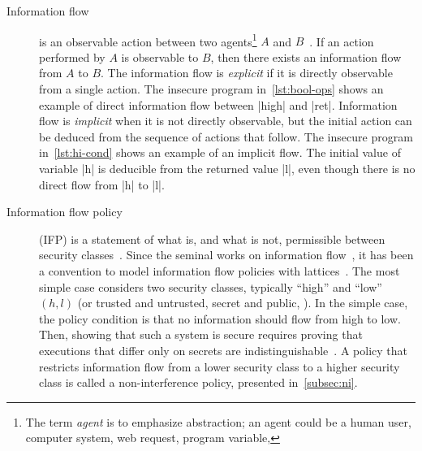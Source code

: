 \begin{description}

\item[Information flow]
is an observable action between two agents\footnote{
The term \emph{agent} is to emphasize abstraction; an agent could be a human user, computer system, web request, program variable, \etc
} \({A}\) and \({B}\)~\cite{eggert2014}.
If an action performed by \({A}\) is observable to \({B}\),
then there exists an information flow from \({A}\) to \({B}\).
The information flow is \emph{explicit} 
if it is directly observable from a single action.
The insecure program in~\autoref{lst:bool-ops} shows an example of direct information flow between \pr|high| and \pr|ret|.
Information flow is \emph{implicit} 
when it is not directly observable, but the initial action can be deduced from the sequence of actions that follow.
The insecure program in~\autoref{lst:hi-cond} shows an example of an implicit flow.
The initial value of variable \pr|h| is deducible from the returned value \pr|l|, even though there is no direct flow from \pr|h| to \pr|l|.

\item[Information flow policy] (IFP)
is a statement of what is, and what is not, permissible between security classes~\cite[p. 9]{bishop2003}.
Since the seminal works on information flow~\cite{biba1977,bell1976}, it has been a convention to model information flow policies with lattices~\cite{denning76}.
The most simple case considers two security classes, 
typically \enquote{high} and \enquote{low} \(({h}, {l})\) (or trusted and untrusted, secret and public, \etc).
In the simple case, the policy condition is that no information should flow from high to low.~\cite{bossi2005}
Then, showing that such a system is secure requires proving that executions that differ only on secrets are indistinguishable~\cite{piessens2024}.
A policy that restricts information flow from a lower security class to a higher security class is called a
{non-interference policy}, presented in~\autoref{subsec:ni}.


\end{description}
